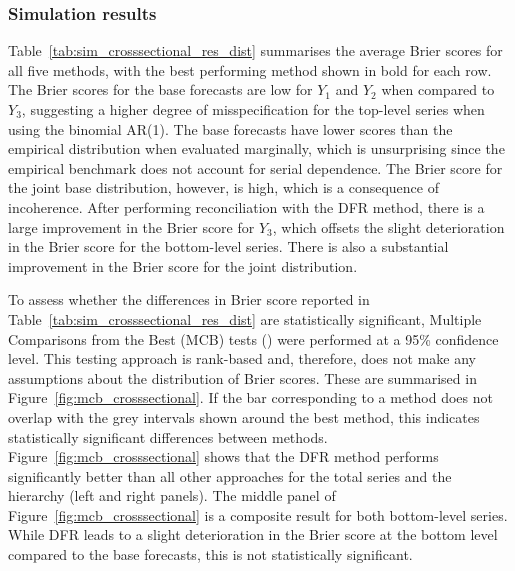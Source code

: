 \documentclass[a4paper,review,12pt,authoryear]{elsarticle}
\theoremstyle{definition}
\begin{document}
    \subsubsection{Simulation results}
    Table~\ref{tab:sim_crosssectional_res_dist} summarises the average Brier scores for all five methods, with the best performing method shown in bold for each row. The Brier scores for the base forecasts are low for $Y_1$ and $Y_2$ when compared to $Y_3$, suggesting a higher degree of misspecification for the top-level series when using the binomial AR(1). The base forecasts have lower scores than the empirical distribution when evaluated marginally, which is unsurprising since the empirical benchmark does not account for serial dependence. The Brier score for the joint base distribution, however, is high, which is a consequence of incoherence. After performing reconciliation with the DFR method, there is a large improvement in the Brier score for $Y_3$, which offsets the slight deterioration in the Brier score for the bottom-level series. There is also a substantial improvement in the Brier score for the joint distribution.
    
    To assess whether the differences in Brier score reported in Table~\ref{tab:sim_crosssectional_res_dist} are statistically significant, Multiple Comparisons from the Best (MCB) tests (\citealp{koningM3CompetitionStatistical2005}) were performed at a 95\% confidence level.
    This testing approach is rank-based and, therefore, does not make any assumptions about the distribution of Brier scores. These are summarised in Figure~\ref{fig:mcb_crosssectional}. If the bar corresponding to a method does not overlap with the grey intervals shown around the best method, this indicates statistically significant differences between methods.
    Figure~\ref{fig:mcb_crosssectional} shows that the DFR method performs significantly better than all other approaches for the total series and the hierarchy (left and right panels). The middle panel of Figure~\ref{fig:mcb_crosssectional} is a composite result for both bottom-level series. While DFR leads to a slight deterioration in the Brier score at the bottom level compared to the base forecasts, this is not statistically significant.
\end{document}
